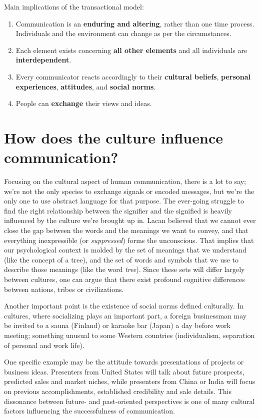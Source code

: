 \documentclass[12pt]{article}
\begin{document}
Main implications of the transactional model:
\begin{enumerate}

\item{Communication is an \textbf{enduring and altering}, rather than one time process. Individuals and the environment can change as per the circumstances.}

\item{Each element exists concerning \textbf{all other elements} and all individuals are \textbf{interdependent}.}

\item{Every communicator reacts accordingly to their \textbf{cultural beliefs}, \textbf{personal experiences}, \textbf{attitudes}, and \textbf{social norms}.}

\item{People can \textbf{exchange} their views and ideas.}
\end{enumerate}

\section{How does the culture influence communication?}
Focusing on the cultural aspect of human communication, there is a lot to say; we're not the only species to exchange signals or encoded messages, but we're the only one to use abstract language for that purpose. The ever-going struggle to find the right relationship between the signifier and the signified is heavily influenced by the culture we're brought up in. Lacan believed that we cannot ever close the gap between the words and the meanings we want to convey, and that everything inexpressible (or \textit{suppressed}) forms the unconscious\cite{lacan}. That implies that our psychological context is molded by the set of meanings that we understand (like the concept of a tree), and the set of words and symbols that we use to describe those meanings (like the word \textit{tree}). Since these sets will differ largely between cultures, one can argue that there exist profound cognitive differences between nations, tribes or civilizations. \par
Another important point is the existence of social norms defined culturally. In cultures, where socializing plays an important part, a foreign businessman may be invited to a sauna (Finland) or karaoke bar (Japan) a day before work meeting; something unusual to some Western countries (individualism, separation of personal and work life). \par
One specific example may be the attitude towards presentations of projects or business ideas. Presenters from United States will talk about future prospects, predicted sales and market niches, while presenters from China or India will focus on previous accomplishments, established credibility and sale details. This dissonance between future- and past-oriented perspectives is one of many cultural factors influencing the successfulness of communication.
\end{document}
